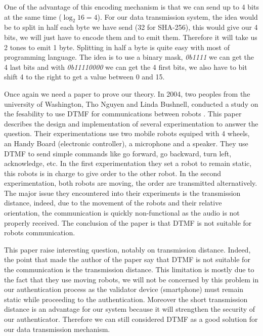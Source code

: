 \documentclass[twocolumn,14pt]{extarticle}
\begin{document}
One of the advantage of this encoding mechanism is that we can send up to 4 bits at the same time ($\log_2 16 = 4$). For our data transmission system, the idea would be to split in half each byte we have send (32 for SHA-256), this would give our 4 bits, we will just have to encode them and to emit them. Therefore it will take us 2 tones to emit 1 byte. Splitting in half a byte is quite easy with most of programming language. The idea is to use a binary mask, \textit{0b1111} we can get the 4 last bits and with \textit{0b11110000} we can get the 4 first bits, we also have to bit shift 4 to the right to get a value between 0 and 15.

Once again we need a paper to prove our theory. In 2004, two peoples from the university of Washington, Tho Nguyen and Linda Bushnell, conducted a study on the fesability to use DTMF for communications between robots \cite{DTMFfeasibility}. This paper describes the design and implementation of several experimentation to answer the question. Their experimentations use two mobile robots equiped with 4 wheels, an Handy Board (electronic controller), a microphone and a speaker. They use DTMF to send simple commands like go forward, go backward, turn left, acknowledge, etc. In the first experimentation they set a robot to remain static, this robots is in charge to give order to the other robot. In the second experimentation, both robots are moving, the order are transmitted alternatively. The major issue they encountered into their experiments is the transmission distance, indeed, due to the movement of the robots and their relative orientation, the communication is quickly non-functional as the audio is not properly received. The conclusion of the paper is that DTMF is not suitable for robots communication.

This paper raise interesting question, notably on transmission distance. Indeed, the point that made the author of the paper say that DTMF is not suitable for the communication is the transmission distance. This limitation is mostly due to the fact that they use moving robots, we will not be concerned by this problem in our authentication process as the validator device (smartphone) must remain static while proceeding to the authentication. Moreover the short transmission distance is an advantage for our system because it will strengthen the security of our authenticator. Therefore we can still considered DTMF as a good solution for our data transmission mechanism.
\end{document}
